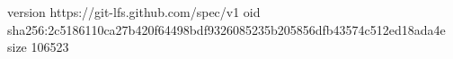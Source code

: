 version https://git-lfs.github.com/spec/v1
oid sha256:2c5186110ca27b420f64498bdf9326085235b205856dfb43574c512ed18ada4e
size 106523
